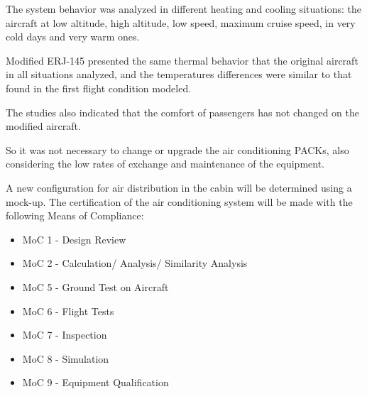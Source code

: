 The system behavior was analyzed in different heating and cooling situations: the aircraft at low altitude, high altitude, low speed, maximum cruise speed, in very cold days and very warm ones.

Modified ERJ-145 presented the same thermal behavior that the original aircraft in all situations analyzed, and the temperatures differences were similar to that found in the first flight condition modeled.

The studies also indicated that the comfort of passengers has not changed on the modified aircraft.

So it was not necessary to change or upgrade the air conditioning PACKs, also considering the low rates of exchange and maintenance of the equipment.

A new configuration for air distribution in the cabin will be determined using a mock-up.
The certification of the air conditioning system will be made with the following Means of Compliance:

\begin{itemize}
  \item MoC 1 - Design Review
  \item MoC 2 - Calculation/ Analysis/ Similarity Analysis
  \item MoC 5 - Ground Test on Aircraft
  \item MoC 6 - Flight Tests
  \item MoC 7 - Inspection
  \item MoC 8 - Simulation
  \item MoC 9 - Equipment Qualification
\end{itemize}
